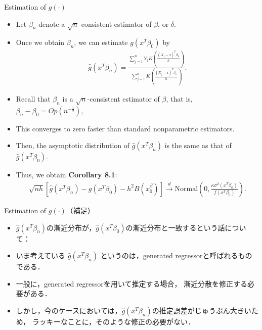 \documentclass[xcolor=svgnames,dvipdfmx,cjk]{beamer}
\theoremstyle{example}
\def\darrow{\xrightarrow{d}}
\begin{document}
\begin{frame}{Estimation of $g(\cdot)$}
\begin{itemize}
  \item Let $\beta_n$ denote a $\sqrt{n}$-consistent estimator of $\beta$, or $\delta$.
  \item Once we obtain $\beta_n$, we can estimate $g(x^T\beta_0)$ by 
        \begin{align*}
          \hat{g}(x^T\beta_n) = 
          \frac
          {\sum_{j=1}^{n} Y_j K \left( \frac{(X_j - x)^T \beta_n}{h} \right)}
          {\sum_{j=1}^{n} K \left( \frac{(X_j - x)^T \beta_n}{h} \right)}.
        \end{align*}
  \item Recall that $\beta_n$ is a $\sqrt{n}$-consistent estimator of $\beta$, that is,
        $\beta_n - \beta_0 = Op(n^{-\frac{1}{2}})$, 
  \item This converges to zero faster than standard nonparametric estimators.
  \item Then, the asymptotic distribution of $\hat{g}(x^T\beta_n)$ is the same as that of $\hat{g}(x^T\beta_0)$.
  \item Thus, we obtain \textbf{Corollary 8.1}:
        \begin{align*}
          \sqrt{nh} [\hat{g}(x^T\beta_n) - g(x^T\beta_0) - h^2 B(x^\beta_0)] 
          \darrow 
          \text{Normal}\left( 0, \frac{\kappa \sigma^2(x^T\beta_0)}{f(x^T\beta_0)} \right).
        \end{align*}
\end{itemize}
\end{frame}

\begin{frame}{Estimation of $g(\cdot)$（補足）}
\begin{itemize}
  \item $\hat{g}(x^T\beta_n)$の漸近分布が，$\hat{g}(x^T\beta_0)$の漸近分布と一致するという話について：
  \item いま考えている
        $\hat{g}(x^T\beta_n)$
        というのは，generated regressorと呼ばれるものである．
  \item 一般に，generated regressorを用いて推定する場合，
        漸近分散を修正する必要がある．
  \item しかし，今のケースにおいては，$\hat{g}(x^T\beta_n)$の推定誤差がじゅうぶん大きいため，
        ラッキーなことに，そのような修正の必要がない．
\end{itemize}
\end{frame}
\end{document}
